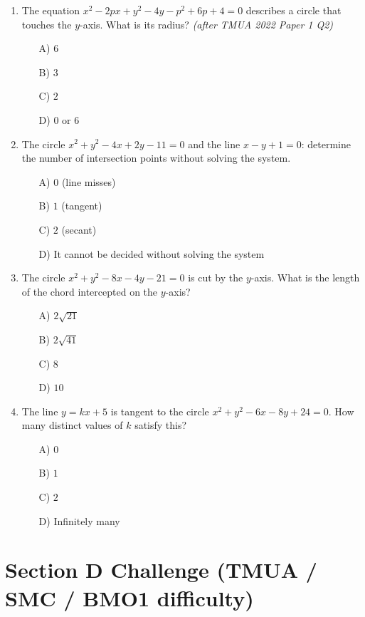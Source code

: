 \documentclass[11pt,a4paper]{article}
\begin{document}
\begin{enumerate}
\item The equation $x^2-2px+y^2-4y-p^2+6p+4=0$ describes a circle that touches the $y$-axis. What is its radius? \textit{\small(after TMUA 2022 Paper 1 Q2)}
\begin{itemize}
\item[A)] $6$
\item[B)] $3$
\item[C)] $2$
\item[D)] $0$ or $6$
\end{itemize}

\item The circle $x^2+y^2-4x+2y-11=0$ and the line $x-y+1=0$: determine the number of intersection points without solving the system.
\begin{itemize}
\item[A)] $0$ (line misses)
\item[B)] $1$ (tangent)
\item[C)] $2$ (secant)
\item[D)] It cannot be decided without solving the system
\end{itemize}

\item The circle $x^2+y^2-8x-4y-21=0$ is cut by the $y$-axis. What is the length of the chord intercepted on the $y$-axis?
\begin{itemize}
\item[A)] $2\sqrt{21}$
\item[B)] $2\sqrt{41}$
\item[C)] $8$
\item[D)] $10$
\end{itemize}

\item The line $y=kx+5$ is tangent to the circle $x^2+y^2-6x-8y+24=0$. How many distinct values of $k$ satisfy this?
\begin{itemize}
\item[A)] $0$
\item[B)] $1$
\item[C)] $2$
\item[D)] Infinitely many
\end{itemize}

\end{enumerate}

\section*{Section D \quad Challenge \hfill{\normalfont\small(TMUA / SMC / BMO1 difficulty)}}
\end{document}
